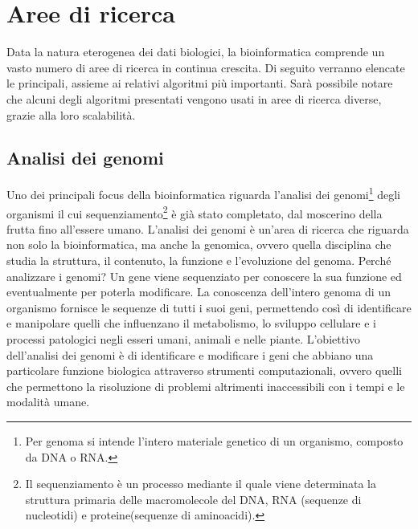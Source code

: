 \section{Aree di ricerca}
Data la natura eterogenea dei dati biologici, la bioinformatica comprende un vasto numero di aree di ricerca in continua crescita. Di seguito verranno elencate le principali, assieme ai relativi algoritmi più importanti. 
\newline
Sarà possibile notare che alcuni degli algoritmi presentati vengono usati in aree di ricerca diverse, grazie alla loro scalabilità.

\subsection{Analisi dei genomi}
Uno dei principali focus della bioinformatica riguarda l'analisi dei genomi\footnote{Per genoma si intende l'intero materiale genetico di un organismo, composto da DNA o RNA.} degli organismi il cui sequenziamento\footnote{Il sequenziamento è un processo mediante il quale viene determinata la struttura primaria delle macromolecole del DNA, RNA (sequenze di nucleotidi) e proteine(sequenze di aminoacidi).} è già stato completato, dal moscerino della frutta fino all'essere umano. L'analisi dei genomi è un'area di ricerca che riguarda non solo la bioinformatica, ma anche la genomica, ovvero quella disciplina che studia la struttura, il contenuto, la funzione e l'evoluzione del genoma.
\newline
Perché analizzare i genomi? Un gene viene sequenziato per conoscere la sua funzione ed eventualmente per poterla modificare. La conoscenza dell'intero genoma di un organismo fornisce le sequenze di tutti i suoi geni, permettendo così di identificare e manipolare quelli che influenzano il metabolismo, lo sviluppo cellulare e i processi patologici negli esseri umani, animali e nelle piante.
\newline
L'obiettivo dell'analisi dei genomi è di identificare e modificare i geni che abbiano una particolare funzione biologica attraverso strumenti computazionali, ovvero quelli che permettono la risoluzione di problemi altrimenti inaccessibili con i tempi e le modalità umane.

